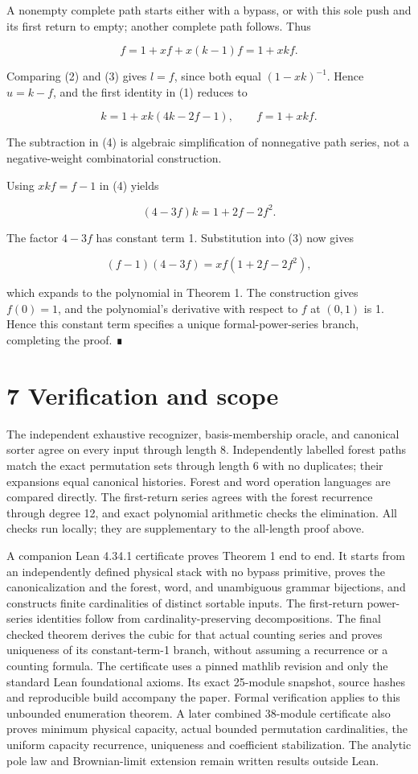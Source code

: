 \documentclass[11pt,letterpaper]{article}
\begin{document}
A nonempty complete path starts either with a bypass, or with this sole
push and its first return to empty; another complete path follows. Thus

\[f=1+xf+x(k-1)f=1+xkf.\tag{3}\]

Comparing (2) and (3) gives \(l=f\), since both equal \((1-xk)^{-1}\).
Hence \(u=k-f\), and the first identity in (1) reduces to

\[k=1+xk(4k-2f-1),\qquad f=1+xkf.\tag{4}\]

The subtraction in (4) is algebraic simplification of nonnegative path
series, not a negative-weight combinatorial construction.

Using \(xkf=f-1\) in (4) yields

\[(4-3f)k=1+2f-2f^2.\]

The factor \(4-3f\) has constant term 1. Substitution into (3) now gives

\[(f-1)(4-3f)=xf(1+2f-2f^2),\]

which expands to the polynomial in Theorem 1. The construction gives
\(f(0)=1\), and the polynomial's derivative with respect to \(f\) at
\((0,1)\) is 1. Hence this constant term specifies a unique
formal-power-series branch, completing the proof. ∎

\section{7 Verification and scope}\label{verification-and-scope}

The independent exhaustive recognizer, basis-membership oracle, and
canonical sorter agree on every input through length 8. Independently
labelled forest paths match the exact permutation sets through length 6
with no duplicates; their expansions equal canonical histories. Forest
and word operation languages are compared directly. The first-return
series agrees with the forest recurrence through degree 12, and exact
polynomial arithmetic checks the elimination. All checks run locally;
they are supplementary to the all-length proof above.

A companion Lean 4.34.1 certificate proves Theorem 1 end to end. It
starts from an independently defined physical stack with no bypass
primitive, proves the canonicalization and the forest, word, and
unambiguous grammar bijections, and constructs finite cardinalities of
distinct sortable inputs. The first-return power-series identities
follow from cardinality-preserving decompositions. The final checked
theorem derives the cubic for that actual counting series and proves
uniqueness of its constant-term-1 branch, without assuming a recurrence
or a counting formula. The certificate uses a pinned mathlib revision
and only the standard Lean foundational axioms. Its exact 25-module
snapshot, source hashes and reproducible build accompany the paper. Formal verification applies to this
unbounded enumeration theorem. A later combined 38-module certificate
also proves minimum physical capacity, actual bounded permutation
cardinalities, the uniform capacity recurrence, uniqueness and
coefficient stabilization. The analytic pole law and Brownian-limit
extension remain written results outside Lean. 
\end{document}
